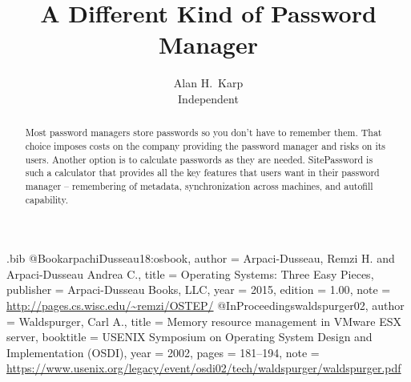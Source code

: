 \usepackage{tikz}
\usepackage{amsmath}

\usepackage{filecontents}

\begin{filecontents}{\jobname.bib}
@Book{arpachiDusseau18:osbook,
  author =       {Arpaci-Dusseau, Remzi H. and Arpaci-Dusseau Andrea C.},
  title =        {Operating Systems: Three Easy Pieces},
  publisher =    {Arpaci-Dusseau Books, LLC},
  year =         2015,
  edition =      {1.00},
  note =         {\url{http://pages.cs.wisc.edu/~remzi/OSTEP/}}
}
@InProceedings{waldspurger02,
  author =       {Waldspurger, Carl A.},
  title =        {Memory resource management in {VMware ESX} server},
  booktitle =    {USENIX Symposium on Operating System Design and
                  Implementation (OSDI)},
  year =         2002,
  pages =        {181--194},
  note =         {\url{https://www.usenix.org/legacy/event/osdi02/tech/waldspurger/waldspurger.pdf}}}
\end{filecontents}



\date{}

\title{\Large \bf A Different Kind of Password Manager}

\def\plainauthor{Author name(s) for PDF metadata. Don't forget to anonymize for submission!}

\author{
{\rm Alan H.\ Karp}\\
Independent
} %

\maketitle
\thecopyright

\begin{abstract}
Most password managers store passwords so you don't have to remember them.  That choice imposes costs on the company providing the password manager and risks on its users.  Another option is to calculate passwords as they are needed.  SitePassword is such a calculator that provides all the key features that users want in their password manager -- remembering of metadata, synchronization across machines, and autofill capability.
\end{abstract}


